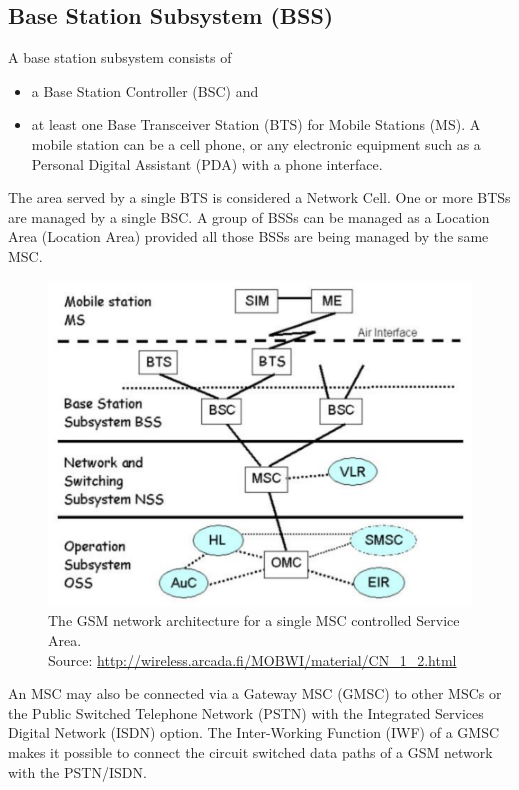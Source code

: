 \subsection{Base Station Subsystem (BSS)}

A base station subsystem consists of
\begin{itemize} 
\item a Base Station Controller (BSC) and
\item at least one Base Transceiver Station (BTS) for Mobile Stations (MS). A mobile station can be a cell phone, or any electronic equipment such as a Personal Digital Assistant (PDA) with a phone interface.
\end{itemize}

The area served by a single BTS is considered a Network Cell. One or more BTSs are managed by a single BSC.  A group of BSSs can be managed as a Location Area (Location Area) provided all those BSSs are being managed by the same MSC.


\begin{figure}
\centering
\includegraphics[scale=0.7]{archMSCServiceArea}
\caption[Network architecture for a single MSC Service Area]{The GSM network architecture for a single MSC controlled Service Area.\\
\footnotesize{Source: \url{http://wireless.arcada.fi/MOBWI/material/CN\_1\_2.html}}}
\end{figure}


An MSC may also be connected via a Gateway MSC (GMSC) to other MSCs or the Public Switched Telephone Network (PSTN) with the Integrated Services Digital Network (ISDN) option. The Inter-Working Function (IWF) of a GMSC makes it possible to connect the circuit switched data paths of a GSM network with the PSTN/ISDN.


